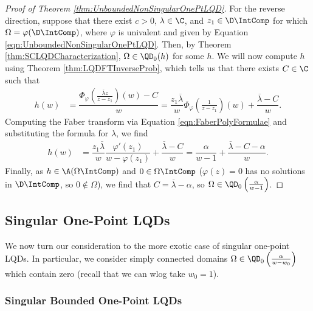 \documentclass{article}
\numberwithin{equation}{section}
\begin{document}
\begin{proof}[Proof of Theorem \ref{thm:UnboundedNonSingularOnePtLQD}]
For the reverse direction, suppose that there exist $c>0$, $\lambda\in\C$, and $z_1\in\D\IntComp$ for which $\Omega=\varphi(\D\IntComp)$, where $\varphi$ is univalent and given by Equation \ref{eqn:UnboundedNonSingularOnePtLQD}. Then, by Theorem \ref{thm:SCLQDCharacterization}, $\Omega\in\QD_0(h)$ for some $h$. We will now compute $h$ using Theorem \ref{thm:LQDFTInverseProb}, which tells us that there exists $C\in\C$ such that
\begin{align*}
h(w)&=\dfrac{\Phi_{\varphi}\left(\frac{\overline{\lambda}z}{z-z_1}\right)(w)-C}{w}=\dfrac{z_1\overline{\lambda}}{w}\Phi_{\varphi}\left(\frac{1}{z-z_1}\right)(w)+\dfrac{\overline{\lambda}-C}{w}.
\end{align*}
Computing the Faber transform via Equation \ref{eqn:FaberPolyFormulae} and substituting the formula for $\lambda$, we find
\begin{align*}
h(w)&=\dfrac{z_1\overline{\lambda}}{w}\dfrac{\varphi'(z_1)}{w-\varphi(z_1)}+\dfrac{\overline{\lambda}-C}{w}=\dfrac{\alpha}{w-1}+\dfrac{\overline{\lambda}-C-\alpha}{w}.
\end{align*}
Finally, as $h\in\A(\Omega\IntComp)$ and $0\in\Omega\IntComp$ ($\varphi(z)=0$ has no solutions in $\D\IntComp$, so $0\notin\Omega$), we find that $C=\overline{\lambda}-\alpha$, so $\Omega\in\QD_0\left(\frac{\alpha}{w-1}\right)$.
\end{proof}






\subsection{Singular One-Point LQDs}\label{subsec:LOGWQDOnePtZ}
We now turn our consideration to the more exotic case of singular one-point LQDs. In particular, we consider simply connected domains $\Omega\in\QD_0\left(\frac{\alpha}{w-w_0}\right)$ which contain zero (recall that we can wlog take $w_0=1$).


\subsubsection{Singular Bounded One-Point LQDs}\label{subsubsec:LOGWQDBoundedOnePtZ}
\end{document}
